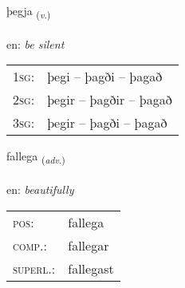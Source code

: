\documentclass[frontgrid, backgrid]{flacards}\usepackage[]{graphicx}\usepackage[]{xcolor}
\begin{document}
\renewcommand{\flhead}{\vskip5pt \fboxsep=0pt {\small\bfseries\footnotesize Sagnorð | Verb}}
\renewcommand{\fcfoot}{\vskip5pt \fboxsep=0pt \hspace{2pt}{\small\bfseries\footnotesize 3K}}

\renewcommand{\blhead}{\vskip5pt {\small\bfseries\footnotesize Sagnorð | Verb }}
\renewcommand{\bcfoot}{\vskip5pt \hspace{2pt}{\small\bfseries\footnotesize 3K}}


{þegja \small{\textsubscript{(\textit{v.})}} \\[1ex] %
\textphonetic{[θeija]} \\
en: \emph{be silent} \\  [2ex]
\renewcommand*{\arraystretch}{0.8}
\begin{tabular}{p{1cm}l}
\textsc{1sg}: & þegi -- þagði -- þagað \\ 
\textsc{2sg}: & þegir -- þagðir -- þagað \\ 
\textsc{3sg}: & þegir -- þagði -- þagað \\ 
\end{tabular}
}

\renewcommand{\flhead}{\vskip5pt \fboxsep=0pt {\small\bfseries\footnotesize Atviksorð | Adverb}}
\renewcommand{\fcfoot}{\vskip5pt \fboxsep=0pt \hspace{2pt}{\small\bfseries\footnotesize 3K}}

\renewcommand{\blhead}{\vskip5pt {\small\bfseries\footnotesize Atviksorð | Adverb }}
\renewcommand{\bcfoot}{\vskip5pt \hspace{2pt}{\small\bfseries\footnotesize 3K}}


{fallega \small{\textsubscript{(\textit{adv.})}} \\[1ex] %
\textphonetic{[fatlɛɣa]} \\
en: \emph{beautifully} \\  [2ex]
\renewcommand*{\arraystretch}{0.8}
\begin{tabular}{ll}
\textsc{pos}: & fallega \\ 
\textsc{comp.}: & fallegar \\ 
\textsc{superl.}: & fallegast \\
\end{tabular}
}
\end{document}
